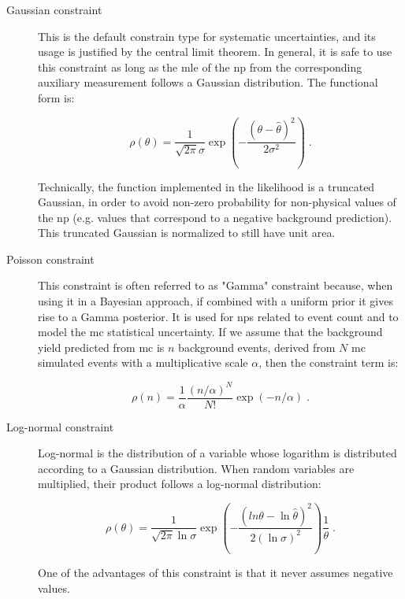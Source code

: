 \begin{description}
\item[Gaussian constraint] This is the default constrain type for systematic uncertainties, and its usage is justified by the central limit theorem. In general, it is safe to use this constraint as long as the \gls{mle} of the \gls{np} from the corresponding auxiliary measurement follows a Gaussian distribution. The functional form is:

\begin{equation}
\label{eq:stat:gauss}
\rho( \theta) = \frac{1}{\sqrt{2\pi}\sigma}\exp\left( -\frac{(\theta - \hat{\theta})^2}{2\sigma^2} \right) \; .
\end{equation}

\noindent Technically, the function implemented in the likelihood is a truncated Gaussian, in order to avoid non-zero probability for non-physical values of the \gls{np} (e.g. values that correspond to a negative background prediction). This truncated Gaussian is normalized to still have unit area.

\item[Poisson constraint] This constraint is often referred to as "Gamma" constraint because, when using it in a Bayesian approach, if combined with a uniform prior it gives rise to a Gamma posterior. It is used for \glspl{np} related to event count and to model the \gls{mc} statistical uncertainty. If we assume that the background yield predicted from \gls{mc} is $n$ background events, derived from $N$ \gls{mc} simulated events with a multiplicative scale $\alpha$, then the constraint term is:

\begin{equation}
\label{eq:stat:poisson}
\rho(n) = \frac{1}{\alpha} \frac{(n/\alpha)^N}{N!} \exp\left( -n/\alpha \right) \; .
\end{equation}

\item[Log-normal constraint] Log-normal is the distribution of a variable whose logarithm is distributed according to a Gaussian distribution. When random variables are multiplied, their product follows a log-normal distribution:

\begin{equation}
\label{eq:stat:lognorm}
\rho( \theta) = \frac{1}{\sqrt{2\pi}\ln{\sigma}}\exp\left( -\frac{(ln{\theta} - \ln{\hat{\theta}})^2}{2(\ln{\sigma})^2} \right)\frac{1}{\theta} \; .
\end{equation}

\noindent One of the advantages of this constraint is that it never assumes negative values.

\end{description}



